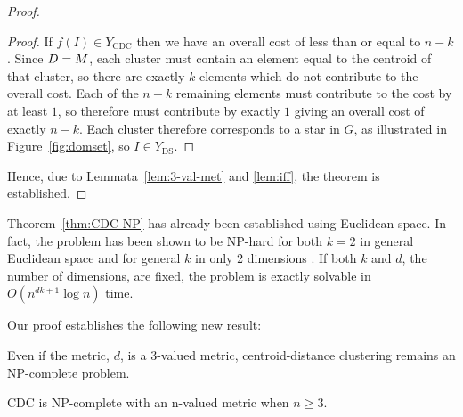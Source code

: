 \begin{proof}
\begin{proof}
    If $f(I) \in Y_{\text{CDC}}$ then we have an overall cost of less than or
    equal to $n-k$.  Since $D = M$, each cluster must contain an element
    equal to the centroid of that cluster, so there are exactly $k$ elements
    which do not contribute to the overall cost.  Each of the $n-k$ remaining
    elements must contribute to the cost by at least $1$, so therefore must
    contribute by exactly $1$ giving an overall cost of exactly $n-k$.  Each
    cluster therefore corresponds to a star in $G$, as illustrated in
    Figure~\ref{fig:domset}, so $I \in Y_{\text{DS}}$.
  \end{proof}

  Hence, due to Lemmata~\ref{lem:3-val-met} and \ref{lem:iff}, the theorem is
  established.
\end{proof}

Theorem~\ref{thm:CDC-NP} has already been established using Euclidean space.
In fact, the problem has been shown to be NP-hard for both $k=2$ in general
Euclidean space \citep{aloise09} and for general $k$ in only 2 dimensions
\citep{mahajan09}.  If both $k$ and $d$, the number of dimensions, are fixed,
the problem is exactly solvable in $O(n^{dk+1} \log n)$
time\citep{inaba94weightedvoronoi}.

Our proof establishes the following new result:
\begin{cor}
  Even if the metric, $d$, is a 3-valued metric, centroid-distance clustering
  remains an NP-complete problem.
\end{cor}

\begin{thm}
  \label{thm:cdc-np-complete-n-val}
  CDC is NP-complete with an n-valued metric when $n \geq 3$.
\end{thm}

